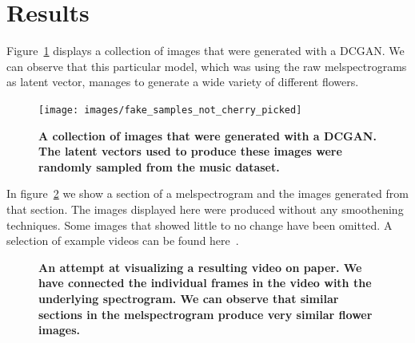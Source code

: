     \section{Results}

        Figure~\ref{fig:dcgan_samples} displays a collection of images that were generated with a DCGAN. We can observe that this particular model, which was using the raw melspectrograms as latent vector, manages to generate a wide variety of different flowers.

        \begin{figure}[ht]
            \centering
            \texttt{[image: images/fake\_samples\_not\_cherry\_picked]}
            \caption[not used]
            {
                \textbf{A collection of images that were generated with a DCGAN. The latent vectors used to produce these images were randomly sampled from the music dataset.}
            }
            \label{fig:dcgan_samples}
        \end{figure}
        
        \newpage
        In figure~\ref{fig:video} we show a section of a melspectrogram and the images generated from that section. The images displayed here were produced without any smoothening techniques. Some images that showed little to no change have been omitted. A selection of example videos can be found here~\cite{examples}.

        \begin{figure}[ht!]
            \centering
            \caption[not used]
            {
                \textbf{An attempt at visualizing a resulting video on paper. We have connected the individual frames in the video with the underlying spectrogram. We can observe that similar sections in the melspectrogram produce very similar flower images.}
            }
            \label{fig:video}
        \end{figure}

